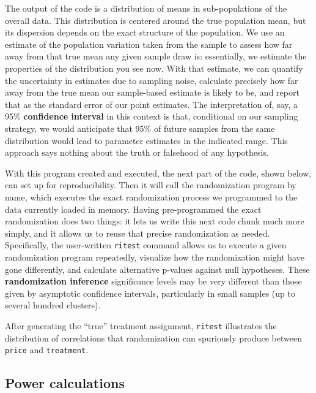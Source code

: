 The output of the code is a distribution of means in sub-populations of the overall data.
This distribution is centered around the true population mean,
but its dispersion depends on the exact structure of the population.
We use an estimate of the population variation taken from the sample
to assess how far away from that true mean any given sample draw is:
essentially, we estimate the properties of the distribution you see now.
With that estimate, we can quantify the uncertainty in estimates due to sampling noise,
calculate precisely how far away from the true mean
our sample-based estimate is likely to be,
and report that as the standard error of our point estimates.
The interpretation of, say, a 95\% \textbf{confidence interval}
in this context is that, conditional on our sampling strategy,
we would anticipate that 95\% of future samples from the same distribution
would lead to parameter estimates in the indicated range.
This approach says nothing about the truth or falsehood of any hypothesis.

With this program created and executed,
the next part of the code, shown below,
can set up for reproducibility.
Then it will call the randomization program by name,
which executes the exact randomization process we programmed
to the data currently loaded in memory.
Having pre-programmed the exact randomization does two things:
it lets us write this next code chunk much more simply,
and it allows us to reuse that precise randomization as needed.
Specifically, the user-written \texttt{ritest} command
allows us to execute a given randomization program repeatedly,
visualize how the randomization might have gone differently,
and calculate alternative p-values against null hypotheses.
These \textbf{randomization inference} significance levels may be very different
than those given by asymptotic confidence intervals,
particularly in small samples (up to several hundred clusters).

After generating the ``true'' treatment assignment,
\texttt{ritest} illustrates the distribution of correlations
that randomization can spuriously produce
between \texttt{price} and \texttt{treatment}.

\subsection{Power calculations}

